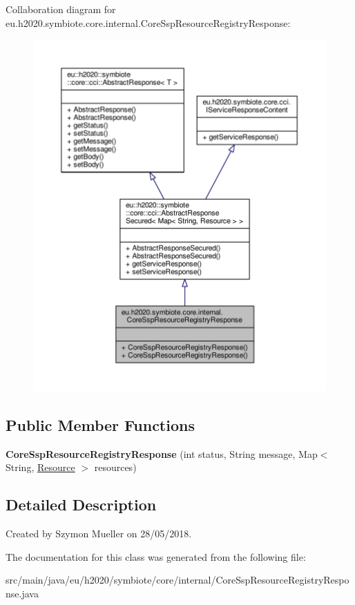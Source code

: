 Collaboration diagram for eu.\+h2020.\+symbiote.\+core.\+internal.\+Core\+Ssp\+Resource\+Registry\+Response\+:
\nopagebreak
\begin{figure}[H]
\begin{center}
\leavevmode
\includegraphics[width=350pt]{classeu_1_1h2020_1_1symbiote_1_1core_1_1internal_1_1CoreSspResourceRegistryResponse__coll__graph}
\end{center}
\end{figure}
\subsection*{Public Member Functions}
\begin{DoxyCompactItemize}
\item 
\mbox{\label{classeu_1_1h2020_1_1symbiote_1_1core_1_1internal_1_1CoreSspResourceRegistryResponse_abbd3bd23bb9021c809a2a42328f41e8c}} 
{\bfseries Core\+Ssp\+Resource\+Registry\+Response} (int status, String message, Map$<$ String, \hyperlink{classeu_1_1h2020_1_1symbiote_1_1model_1_1cim_1_1Resource}{Resource} $>$ resources)
\end{DoxyCompactItemize}


\subsection{Detailed Description}
Created by Szymon Mueller on 28/05/2018. 

The documentation for this class was generated from the following file\+:\begin{DoxyCompactItemize}
\item 
src/main/java/eu/h2020/symbiote/core/internal/Core\+Ssp\+Resource\+Registry\+Response.\+java\end{DoxyCompactItemize}
